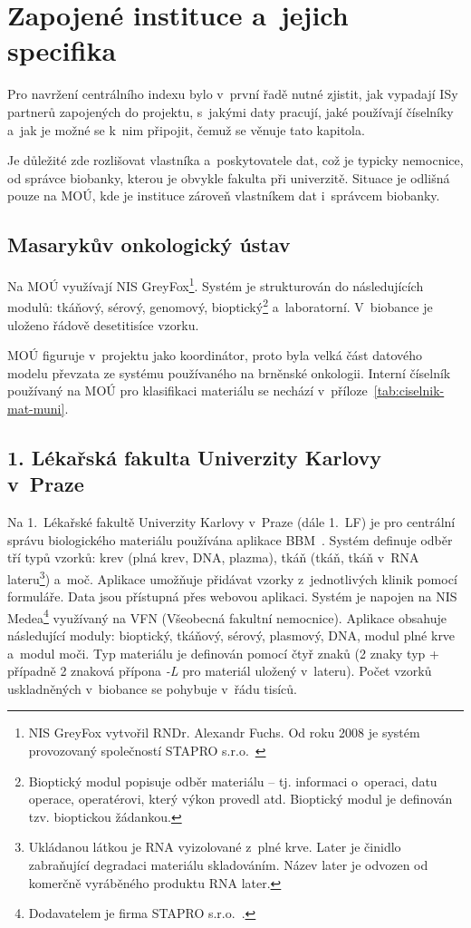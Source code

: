 \documentclass[11pt, draft, oneside]{fithesis2}
\begin{document}
\section{Zapojené instituce a~jejich specifika}\label{sec:instituce}
Pro navržení centrálního indexu bylo v~první řadě nutné zjistit, jak vypadají ISy partnerů zapojených do projektu, s~jakými daty pracují, jaké používají číselníky a~jak je možné se k~nim připojit, čemuž se věnuje tato kapitola.

Je důležité zde rozlišovat vlastníka a~poskytovatele dat, což je typicky nemocnice, od správce biobanky, kterou je obvykle fakulta při univerzitě. Situace je odlišná pouze na MOÚ, kde je instituce zároveň vlastníkem dat i~správcem biobanky.

\subsection{Masarykův onkologický ústav}
Na MOÚ využívají NIS GreyFox\footnote{NIS GreyFox vytvořil RNDr. Alexandr Fuchs. Od roku 2008 je systém provozovaný společností STAPRO s.r.o.~\cite{GreyFox}}. Systém je strukturován do následujících modulů: tkáňový, sérový, genomový, bioptický\footnote{Bioptický modul popisuje odběr materiálu -- tj. informaci o~operaci, datu operace, operatérovi, který výkon provedl atd. Bioptický modul je definován tzv. bioptickou žádankou.} a~laboratorní. V~biobance je uloženo řádově desetitisíce vzorku.

MOÚ figuruje v~projektu jako koordinátor, proto byla velká část datového modelu převzata ze systému používaného na brněnské onkologii. Interní číselník používaný na MOÚ pro klasifikaci materiálu se nechází v~příloze~\ref{tab:ciselnik-mat-muni}.

\subsection{1. Lékařská fakulta Univerzity Karlovy v~Praze}

Na 1.~Lékařské fakultě Univerzity Karlovy v~Praze (dále 1.~LF) je pro centrální správu biologického materiálu používána aplikace BBM~\cite{1LF_BBM}. Systém definuje odběr tří typů vzorků: krev (plná krev, DNA, plazma), tkáň (tkáň, tkáň v~RNA lateru\footnote{Ukládanou látkou je RNA vyizolované z~plné krve. Later je činidlo zabraňující degradaci materiálu skladováním. Název later je odvozen od komerčně vyráběného produktu RNA later.}) a~moč. Aplikace umožňuje přidávat vzorky z~jednotlivých klinik pomocí formuláře. Data jsou přístupná přes webovou aplikaci.
Systém je napojen na NIS Medea\footnote{Dodavatelem je firma STAPRO s.r.o.~\cite{Medea}.} využívaný na VFN (Všeobecná fakultní nemocnice). 
Aplikace obsahuje následující moduly:  bioptický, tkáňový, sérový, plasmový, DNA, modul plné krve a~modul moči.
Typ materiálu je definován pomocí čtyř znaků (2 znaky typ + případně 2 znaková přípona \textit{-L} pro materiál uložený v~lateru). Počet vzorků uskladněných v~biobance se pohybuje v~řádu tisíců.
\end{document}
